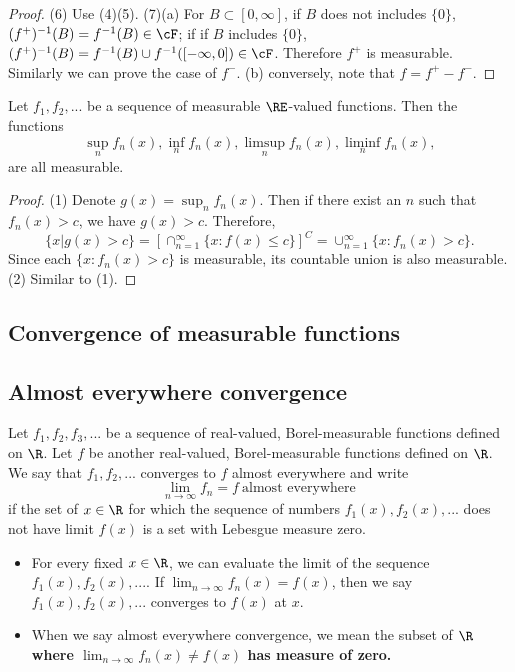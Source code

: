\begin{refsection}
\begin{proof}
(6) Use (4)(5).
(7)(a) For $B \subset [0,\infty]$, if $B$ does not includes $\{0\}$, $(f^+)^{-1}(B) = f^{-1}(B)\in \cF$; if if $B$  includes $\{0\}$, $(f^+)^{-1}(B) = f^{-1}(B) \cup f^{-1}([-\infty,0]) \in \cF$. Therefore $f^+$ is measurable. Similarly we can prove the case of $f^-$. 
(b) conversely, note that $f = f^+-f^-$.
\end{proof}


\begin{lemma}\label{ch:calculus:th:measurabilityAndLimits}
Let $f_1,f_2,...$ be a sequence of measurable $\RE$-valued functions. Then the functions 
$$\sup_n f_n(x), \inf_n f_n(x), \limsup_n f_n(x), \liminf_n f_n(x),$$
are all measurable.	
\end{lemma}
\begin{proof}
(1)	Denote $g(x) =\sup_n f_n(x) $. Then if there exist an $n$ such that $f_n(x) > c$, we have $g(x) > c$. Therefore, $$\{x|g(x) > c\} = [\cap^\infty_{n=1} \{x:f(x)\leq c\}]^C =\cup_{n=1}^\infty \{x:f_n(x) > c\}.$$
Since each $\{x:f_n(x)>c\}$ is measurable, its countable union is also measurable. (2) Similar to (1).

	
\end{proof}


\subsection{Convergence of measurable functions}

\subsection{Almost everywhere convergence}
\begin{definition}\cite[24]{shreve2004stochastic2}
	Let $f_1,f_2,f_3,...$ be a sequence of real-valued, Borel-measurable functions defined on $\R$. Let $f$ be another real-valued, Borel-measurable functions defined on $\R$. We say that $f_1,f_2,...$ converges to $f$ almost everywhere and write
	$$\lim_{n\rightarrow\infty} f_n = f ~ \text{almost everywhere} ~$$
	if the set of $x\in \R$ for which the sequence of numbers $f_1(x),f_2(x),...$ does not have limit $f(x)$ is a set with Lebesgue measure zero.
\end{definition}

\begin{remark}[interpretation]\hfill
\begin{itemize}
	\item For every fixed $x\in \R$, we can evaluate the limit of the sequence $f_1(x),f_2(x),...$. If $\lim_{n\to\infty} f_n(x) = f(x)$, then we say $f_1(x),f_2(x),...$ converges to $f(x)$ at $x$.
	\item When we say almost everywhere convergence, we mean the subset of $\R$ \textbf{where $\lim_{n\to \infty} f_n(x) \neq f(x)$ has measure of zero.}  
\end{itemize}	
\end{remark}


\end{refsection}
